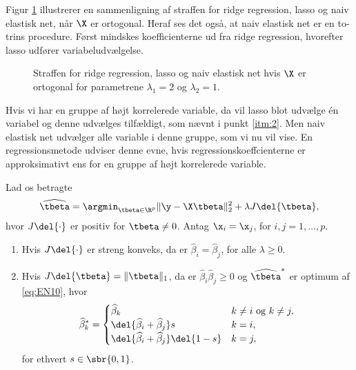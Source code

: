 %
Figur \ref{fig:elastisk2} illustrerer en sammenligning af straffen for ridge regression, lasso og naiv elastisk net, når \(\X\) er ortogonal.
Heraf ses det også, at naiv elastisk net er en to-trins procedure.
Først mindskes koefficienterne ud fra ridge regression, hvorefter lasso udfører variabeludvælgelse. 
%
\begin{figure}[H]
\centering
\scalebox{0.8}{}
\caption{Straffen for ridge regression, lasso og naiv elastisk net hvis \(\X\) er ortogonal for parametrene \(\lambda_1=2\) og \(\lambda_2=1\).} \label{fig:elastisk2}
\end{figure}
Hvis vi har en gruppe af højt korrelerede variable, da vil lasso blot udvælge én variabel og denne udvælges tilfældigt, som nævnt i punkt \ref{itm:2}.
Men naiv elastisk net udvælger alle variable i denne gruppe, som vi nu vil vise. 
En regressionsmetode udviser denne evne, hvis regressionskoeffcienterne er approksimativt ens for en gruppe af højt korrelerede variable.
%
\begin{lem} \label{lem:elastisk_net2}
Lad os betragte
\begin{align}
\widehat{\tbeta} = \argmin_{\tbeta \in \R^p} \Vert \y - \X \tbeta \Vert_2^2 + \lambda J \del{\tbeta}, \label{eq:EN10}
\end{align}
hvor \(J \del{\cdot}\) er positiv for \(\tbeta \neq 0\).
Antag \(\x_i = \x_j\), for \(i, j = 1, \ldots, p\).
\begin{enumerate}[label=\alph*)]
\item Hvis \(J \del{\cdot}\) er streng konveks, da er \(\widehat{\beta}_i = \widehat{\beta}_j\), for alle \(\lambda \geq 0\).
\item Hvis \(J \del{\tbeta} = \Vert \tbeta \Vert_1\), da er \(\widehat{\beta}_i \widehat{\beta}_j \geq 0\) og \(\widehat{\tbeta}^*\) er optimum af \eqref{eq:EN10}, hvor
\begin{align*}
\widehat{\beta}_k^* = \begin{cases}
\widehat{\beta}_k & k \neq i \text{ og } k \neq j, \\
\del{\widehat{\beta}_i + \widehat{\beta}_j} s & k = i, \\
\del{\widehat{\beta}_i + \widehat{\beta}_j} \del{1-s} & k = j,
\end{cases}
\end{align*}
for ethvert \(s \in \sbr{0,1}\).
\end{enumerate}
\end{lem}
